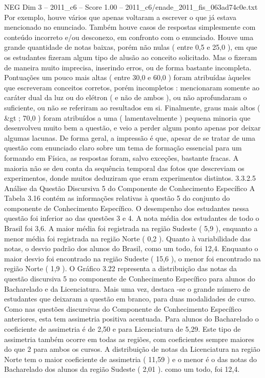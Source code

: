 \begin{textsample}{NEG Dim 3 – 2011\_c6 – Score 1.00 – 2011\_c6/enade\_2011\_fis\_063ad74c0e.txt}
Por exemplo, houve vários que apenas voltaram a escrever o que já estava mencionado no enunciado.
Também houve casos de respostas simplesmente com conteúdo incorreto e/ou desconexo, em confronto com o enunciado.
Houve uma grande quantidade de notas baixas, porém não nulas ( entre 0,5 e 25,0 ), em que os estudantes fizeram algum tipo de alusão ao conceito solicitado.
Mas o fizeram de maneira muito imprecisa, inserindo erros, ou de forma bastante incompleta.
Pontuações um pouco mais altas ( entre 30,0 e 60,0 ) foram atribuídas àqueles que escreveram conceitos corretos, porém incompletos : mencionaram somente ao caráter dual da luz ou do elétron ( e não de ambos ), ou não aprofundaram o suficiente, ou não se referiram ao resultados em si.
Finalmente, graus mais altos ( \&gt ; 70,0 ) foram atribuídos a uma ( lamentavelmente ) pequena minoria que desenvolveu muito bem a questão, e veio a perder algum ponto apenas por deixar algumas lacunas.
De forma geral, a impressão é que, apesar de se tratar de uma questão com enunciado claro sobre um tema de formação essencial para um formando em Física, as respostas foram, salvo exceções, bastante fracas.
A maioria não se deu conta da sequência temporal das fotos que descreviam os experimentos, donde muitos deduziram que eram experimentos distintos. 3.3.2.5 Análise da Questão Discursiva 5 do Componente de Conhecimento Específico A Tabela 3.16 contém as informações relativas à questão 5 do conjunto do componente de Conhecimento Específico.
O desempenho dos estudantes nessa questão foi inferior ao das questões 3 e 4.
A nota média dos estudantes de todo o Brasil foi 3,6.
A maior média foi registrada na região Sudeste ( 5,9 ), enquanto a menor média foi registrada na região Norte ( 0,2 ).
Quanto à variabilidade das notas, o desvio padrão dos alunos do Brasil, como um todo, foi 12,4.
Enquanto o maior desvio foi encontrado na região Sudeste ( 15,6 ), o menor foi encontrado na região Norte ( 1,9 ).
O Gráfico 3.22 representa a distribuição das notas da questão discursiva 5 no componente de Conhecimento Específico para alunos do Bacharelado e da Licenciatura.
Mais uma vez, destaca -se o grande número de estudantes que deixaram a questão em branco, para duas modalidades de curso.
Como nas questões discursivas do Componente de Conhecimento Específico anteriores, esta tem assimetria positiva acentuada.
Para alunos do Bacharelado o coeficiente de assimetria é de 2,50 e para Licenciatura de 5,29.
Este tipo de assimetria também ocorre em todas as regiões, com coeficientes sempre maiores do que 2 para ambos os cursos.
A distribuição de notas da Licenciatura na região Norte tem o maior coeficiente de assimetria ( 11,59 ) e o menor é o das notas do Bacharelado dos alunos da região Sudeste ( 2,01 ). como um todo, foi 12,4.

\end{textsample}
